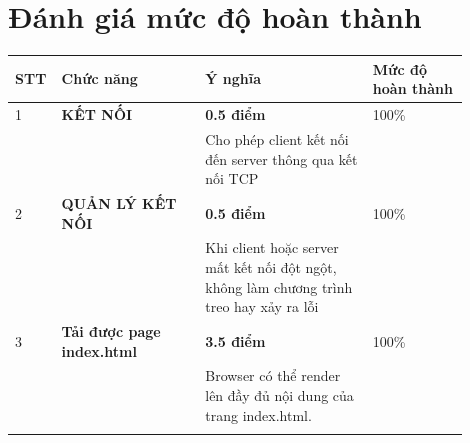 \documentclass[14pt, a4paper]{extarticle}
\begin{document}
\section{Đánh giá mức độ hoàn thành}
\begin{table}[h!]
    \centering
    \begin{tabular}{| p{0.05\linewidth}| p{0.3\linewidth}| p{0.35\linewidth}| p{0.20\linewidth}|}
        \hline
        \textbf{STT}                                                          & \textbf{Chức năng}                & \textbf{Ý nghĩa}                                                                                    & \textbf{Mức độ hoàn thành} \\
        \hline
        1                                                                     & \textbf{KẾT NỐI}                  & \textbf{0.5 điểm}                                                                                   & 100\%                      \\
                                                                              &                                   & Cho phép client kết nối đến server thông qua kết nối TCP                                            &                            \\
        \hline
        2                                                                     & \textbf{QUẢN LÝ KẾT NỐI}          & \textbf{0.5 điểm}                                                                                   & 100\%                      \\
                                                                              &                                   & Khi client hoặc server mất kết nối đột ngột, không làm chương trình treo hay xảy ra lỗi             &                            \\
        \hline
        3                                                                     & \textbf{Tải được page index.html} & \textbf{3.5 điểm}                                                                                   & 100\%                      \\
                                                                              &                                   & Browser có thể render lên đầy đủ nội dung của trang index.html.                                     &                            \\
                                                                              &                                   &

\end{tabular}
\end{table}
\end{document}
